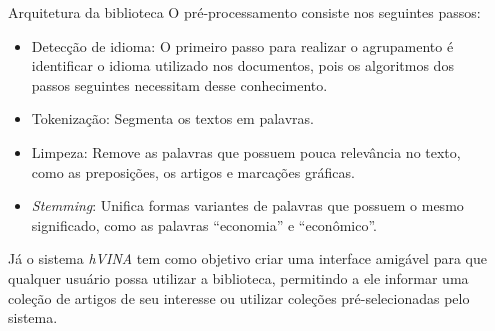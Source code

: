 \documentclass[final]{beamer}
\newlength{\sepwid}
\newlength{\onecolwid}
\newlength{\twocolwid}
\begin{document}
\begin{frame}[t]
\begin{columns}[t]
\begin{column}{\twocolwid}
\begin{columns}[t,totalwidth=\twocolwid]
\begin{column}{\onecolwid}
\begin{block}{Arquitetura da biblioteca}
O pré-processamento consiste nos seguintes passos:

\begin{itemize}
\item Detecção de idioma: O primeiro passo para realizar o agrupamento é identificar o idioma utilizado nos documentos, pois os algoritmos dos passos seguintes necessitam desse conhecimento. %
\item Tokenização: Segmenta os textos em palavras.
\item Limpeza: Remove as palavras que possuem pouca relevância no texto, como as preposições, os artigos e marcações gráficas.
\item \textit{Stemming}: Unifica formas variantes de palavras que possuem o mesmo significado, como as palavras ``economia'' e ``econômico''.
\end{itemize}





Já o sistema \textit{hVINA} tem como objetivo criar uma interface amigável para que qualquer usuário possa utilizar a biblioteca, permitindo a ele informar uma coleção de artigos de seu interesse ou utilizar coleções pré-selecionadas pelo sistema.


\end{block}


\end{column} %

\end{columns} %

\end{column} %

\begin{column}{\sepwid}\end{column} %


\end{columns}
\end{frame}
\end{document}

